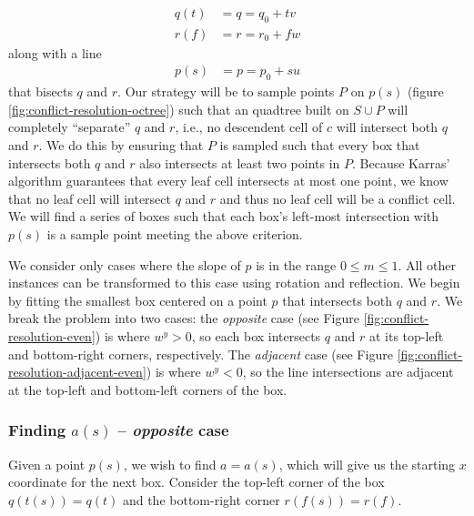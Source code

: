 \documentclass[submission]{gmp2017}
\begin{document}
\begin{align}
q(t) &= q = q_0 + tv \label{eqn:q} \\
r(f) &= r = r_0 + fw \label{eqn:r}
\end{align}
along with a line
\begin{align}
p(s) &= p = p_0 + su \label{eqn:p}
\end{align}
that bisects $q$ and $r$. Our strategy will be to sample points $P$ on $p(s)$ (figure \ref{fig:conflict-resolution-octree}) such that an quadtree built on $S \cup P$ will completely ``separate'' $q$ and $r$, i.e., no descendent cell of $c$ will intersect both $q$ and $r$. We do this by ensuring that $P$ is sampled such that every box that intersects both $q$ and $r$ also intersects at least two points in $P$. Because Karras' algorithm guarantees that every leaf cell intersects at most one point, we know that no leaf cell will intersect $q$ and $r$ and thus no leaf cell will be a conflict cell. We will find a series of boxes such that each box's left-most intersection with $p(s)$ is a sample point meeting the above criterion.

We consider only cases where the slope of $p$ is in the range $0 \le m \le 1$. All other instances can be transformed to this case using rotation and reflection. We begin by fitting the smallest box centered on a point $p$ that intersects both $q$ and $r$. We break the problem into two cases: the \textit{opposite} case (see Figure \ref{fig:conflict-resolution-even}) is where $w^y > 0$, so each box intersects $q$ and $r$ at its top-left and bottom-right corners, respectively. The \textit{adjacent} case (see Figure \ref{fig:conflict-resolution-adjacent-even}) is where $w^y < 0$, so the line intersections are adjacent at the top-left and bottom-left corners of the box.

\subsubsection{Finding $a(s)$ -- \textit{opposite} case}

Given a point $p(s)$, we wish to find $a=a(s)$, which will give us the starting $x$ coordinate for the next box. Consider the top-left corner of the box $q(t(s))=q(t)$ and the bottom-right corner $r(f(s))=r(f)$.
\end{document}

